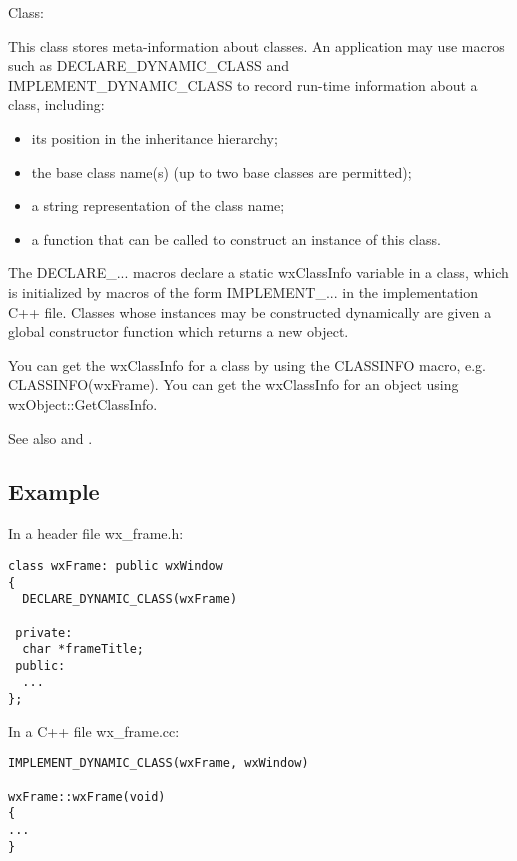 
Class: 

This class stores meta-information about classes. An application
may use macros such as DECLARE\_DYNAMIC\_CLASS and IMPLEMENT\_DYNAMIC\_CLASS
to record run-time information about a class, including:

\begin{itemize}\itemsep=0pt
\item its position in the inheritance hierarchy;
\item the base class name(s) (up to two base classes are permitted);
\item a string representation of the class name;
\item a function that can be called to construct an instance of this class.
\end{itemize}

The DECLARE\_... macros declare a static wxClassInfo variable in a class, which is initialized
by macros of the form IMPLEMENT\_... in the implementation C++ file. Classes whose instances may be
constructed dynamically are given a global constructor function which returns a new object.

You can get the wxClassInfo for a class by using the CLASSINFO macro, e.g. CLASSINFO(wxFrame).
You can get the wxClassInfo for an object using wxObject::GetClassInfo.

See also  and .

\subsection{Example}

In a header file wx\_frame.h:

\begin{verbatim}
class wxFrame: public wxWindow
{
  DECLARE_DYNAMIC_CLASS(wxFrame)

 private:
  char *frameTitle;
 public:
  ...
};
\end{verbatim}

In a C++ file wx\_frame.cc:

\begin{verbatim}
IMPLEMENT_DYNAMIC_CLASS(wxFrame, wxWindow)

wxFrame::wxFrame(void)
{
...
}
\end{verbatim}


